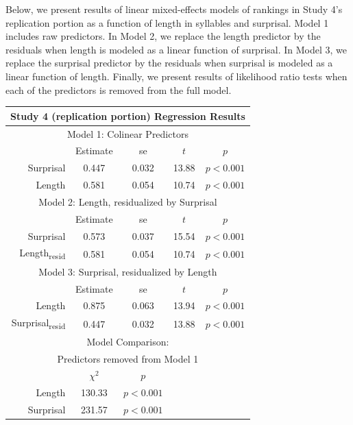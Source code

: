 \vspace{4mm}

Below, we present results of linear mixed-effects models of rankings in Study 4's replication portion as a function of length in syllables and surprisal.
Model 1 includes raw predictors.
In Model 2, we replace the length predictor by the residuals when length is modeled as a linear function of surprisal.
In Model 3, we replace the surprisal predictor by the residuals when surprisal is modeled as a linear function of length.
Finally, we present results of likelihood ratio tests when each of the predictors is removed from the full model.

\vspace{4mm}

\noindent
\footnotesize{
\begin{tabular}{r|cccc}
\hline
\hline
\multicolumn{5}{c}{\textbf{Study 4 (replication portion) Regression Results}} \\
\hline
\hline
\multicolumn{5}{c}{Model 1: Colinear Predictors} \\
& Estimate & se & $t$ & $p$ \\
\hline
Surprisal & 0.447 & 0.032 & 13.88 & $p<0.001$ \\
Length & 0.581 & 0.054 & 10.74 & $p<0.001$ \\
\hline
\hline
\multicolumn{5}{c}{Model 2: Length, residualized by Surprisal} \\
& Estimate & se & $t$ & $p$ \\
\hline
Surprisal & 0.573 & 0.037 & 15.54 & $p<0.001$ \\
Length\textsubscript{resid} & 0.581 & 0.054 & 10.74 & $p<0.001$ \\
\hline
\hline
\multicolumn{5}{c}{Model 3: Surprisal, residualized by Length} \\
& Estimate & se & $t$ & $p$ \\
\hline
Length & 0.875 & 0.063 & 13.94 & $p<0.001$ \\
Surprisal\textsubscript{resid} & 0.447 & 0.032 & 13.88 & $p<0.001$ \\
\hline
\hline
\multicolumn{5}{c}{Model Comparison:} \\
\multicolumn{5}{c}{Predictors removed from Model 1} \\
& $\chi^2$ & $p$ \\
\hline
Length & 130.33 & $p<0.001$ \\
Surprisal & 231.57 & $p<0.001$ \\
\hline
\hline
\end{tabular}
}








